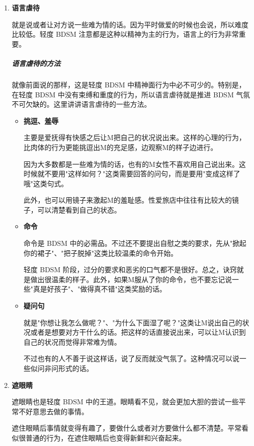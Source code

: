 \documentclass[12pt,UTF8]{ctexbook}
\begin{document}
\begin{enumerate}
	\item \textbf{语言虐待}

	就是说或者让对方说一些难为情的话。因为平时做爱的时候也会说，所以难度比较低。轻度 BDSM 注意都是这种以精神为主的行为，语言上的行为非常重要。

	\subparagraph{语言虐待的方法}

	就像前面说的那样，这是轻度 BDSM 中精神面行为中必不可少的。特别是，在轻度 BDSM 中没有束缚和重度的行为，所以语言虐待就是推进 BDSM 气氛不可欠缺的。这里讲讲语言虐待的一些方法。

	\begin{itemize}
		\item \textbf{挑逗、羞辱}

		主要是爱抚得有快感之后让M把自己的状况说出来。这样的心理的行为，比肉体的行为更能挑逗出M的充足感，边观察M的样子边进行。

		因为大多数都是一些难为情的话，也有的M女性不喜欢用自己说出来。这时候就不要用"这样如何？"这类需要回答的问句，而是要用"变成这样了哦"这类句式。

		此外，也可以用镜子来激起M的羞耻感。性爱旅店中往往有比较大的镜子，可以清楚看到自己的状态。

		\item \textbf{命令}

		命令是 BDSM 中的必需品。不过还不要提出自慰之类的要求，先从"掀起你的裙子"、"把子脱掉"这类比较温柔的命令开始。

		轻度 BDSM 阶段，过分的要求和恶劣的口气都不是很好。总之，诀窍就是做出很温柔的样子。此外，如果M服从了你的命令，也不要忘记说一些"真是好孩子"、"做得真不错"这类奖励的话。

		\item \textbf{疑问句}

		就是"你想让我怎么做呢？"、"为什么下面湿了呢？"这类让M说出自己的状况或者是想要对方干什么的话。把这样的话直接说出来，可以让M认识到自己的状况而觉得非常难为情。

		不过也有的人不善于说这样话，说了反而就没气氛了。这种情况可以说一些似问非问形式的话。
	\end{itemize}

	\item \textbf{遮眼睛}

遮眼睛也是轻度 BDSM 中的王道。眼睛看不见，就会更加大胆的尝试一些平常不好意思去做的事情。

遮住眼睛后事情就变得有趣了，要做什么或者对方要做什么都不清楚。平常看似很普通的行为，在遮住眼睛后也变得新鲜和兴奋起来。


\end{enumerate}
\end{document}
